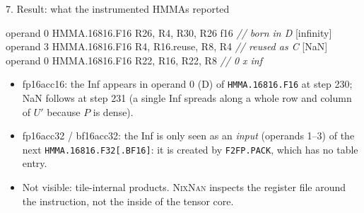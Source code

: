 \documentclass[aspectratio=169,10pt]{beamer}
\newcommand{\nn}{\textsc{NixNan}}
\newcommand{\tx}[1]{\texttt{\small #1}}
\begin{document}
\begin{frame}[fragile]{7. Result: what the instrumented HMMAs reported}
\scriptsize
\begin{semiverbatim}
[infinity] operand 0  HMMA.16816.F16 R26, R4, R30, R26   f16  \textit{// born in D}
[infinity] operand 3  HMMA.16816.F16 R4, R16.reuse, R8, R4    \textit{// reused as C}
[NaN]      operand 0  HMMA.16816.F16 R22, R16, R22, R8        \textit{// 0 x inf}
\end{semiverbatim}
\footnotesize
\begin{itemize}
\item fp16acc16: the Inf appears in operand 0 (D) of \tx{HMMA.16816.F16} at step 230; NaN follows at step 231 (a single Inf spreads along a whole row and column of $U'$ because $P$ is dense).
\item fp16acc32 / bf16acc32: the Inf is only seen as an \emph{input} (operands 1--3) of the next \tx{HMMA.16816.F32[.BF16]}: it is created by \tx{F2FP.PACK}, which has no table entry.
\item Not visible: tile-internal products. \nn{} inspects the register file around the instruction, not the inside of the tensor core.
\end{itemize}
\end{frame}
\end{document}

